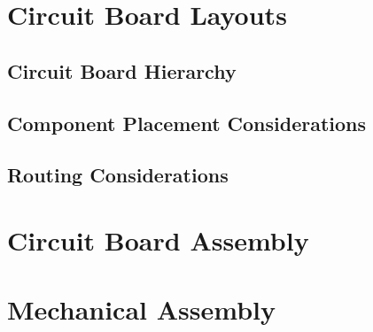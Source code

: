 \section{Circuit Board Layouts}
	\subsection{Circuit Board Hierarchy}
	\subsection{Component Placement Considerations}
	\subsection{Routing Considerations}
\section{Circuit Board Assembly}
\section{Mechanical Assembly}